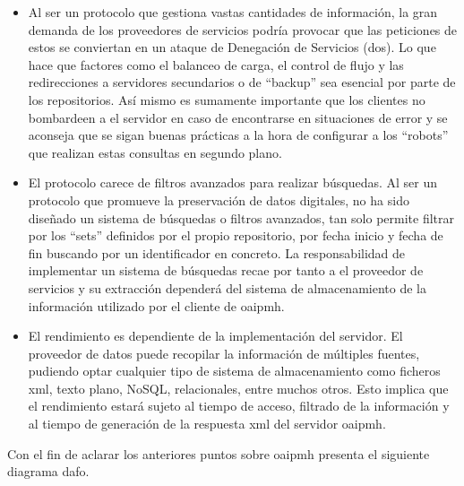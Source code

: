 \begin{itemize}
	\item Al ser un protocolo que gestiona vastas cantidades de información, la gran demanda de los proveedores de servicios podría provocar que las peticiones de estos se conviertan en un ataque de Denegación de Servicios (\acrshort{dos}). Lo que hace que factores como el balanceo de carga, el control de flujo y las redirecciones a servidores secundarios o de ``backup'' sea  esencial por parte de los repositorios. Así mismo es sumamente importante que los clientes no bombardeen a el servidor en caso de encontrarse en situaciones de error y se aconseja que se sigan buenas prácticas a la hora de configurar a los ``robots'' que realizan estas consultas en segundo plano.

	\item El protocolo carece de filtros avanzados para realizar búsquedas. Al ser un protocolo que promueve la preservación de datos digitales, no ha sido diseñado un sistema de búsquedas o filtros avanzados, tan solo permite filtrar por los ``sets'' definidos por el propio repositorio, por fecha inicio y fecha de fin buscando por un identificador en concreto. La responsabilidad de implementar un sistema de búsquedas recae por tanto a el proveedor de servicios y su extracción dependerá del sistema de almacenamiento de la información utilizado por el cliente de \acrshort{oaipmh}.

	\item El rendimiento es dependiente de la implementación del servidor. El proveedor de datos puede recopilar la información de múltiples fuentes, pudiendo optar cualquier tipo de sistema de almacenamiento como ficheros \acrshort{xml}, texto plano, NoSQL\cite{NoSQL},  relacionales, entre muchos otros. Esto implica que el rendimiento estará sujeto al tiempo de acceso, filtrado de la información y al tiempo de generación de la respuesta \acrshort{xml} del servidor \acrshort{oaipmh}.
\end{itemize}

Con el fin de aclarar los anteriores puntos sobre \acrshort{oaipmh} presenta el siguiente diagrama \acrfull{dafo}.

